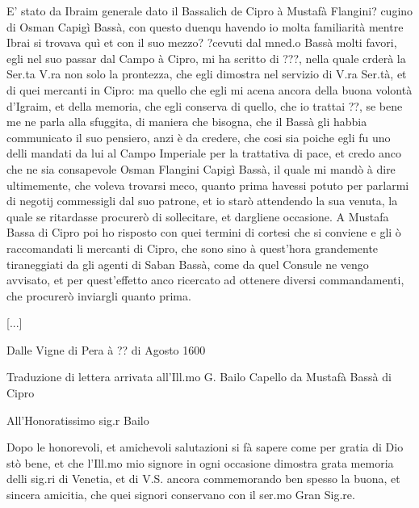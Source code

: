 E'  stato da  Ibraim generale  dato il  Bassalich de  Cipro  à Mustafà
Flangini? cugino di  Osman Capigì Bassà, con questo  duenqu havendo io
molta familiarità  mentre Ibrai  si trovava quì  et con il  suo mezzo?
?cevuti dal mned.o Bassà molti favori, egli nel suo passar dal Campo à
Cipro, mi  ha scritto di  ???, nella quale  crderà la Ser.ta  V.ra non
solo la prontezza,  che egli dimostra nel servizio  di V.ra Ser.tà, et
di quei  mercanti in Cipro: ma  quello che egli mi  acena ancora della
buona volontà d'Igraim, et della memoria, che egli conserva di quello,
che io trattai  ??, se bene me ne parla alla  sfuggita, di maniera che
bisogna, che il  Bassà gli habbia communicato il  suo pensiero, anzi è
da credere,  che cosi sia poiche egli  fu uno delli mandati  da lui al
Campo Imperiale  per la trattativa di  pace, et credo anco  che ne sia
consapevole  Osman Flangini  Capigì Bassà,  il quale  mi mandò  à dire
ultimemente, che voleva trovarsi meco, quanto prima havessi potuto per
parlarmi  di  negotij  commessigli   dal  suo  patrone,  et  io  starò
attendendo  la  sua  venuta,  la  quale  se  ritardasse  procurerò  di
sollecitare, et dargliene  occasione. A Mustafa Bassa di  Cipro poi ho
risposto  con  quei  termini  di  cortesi  che si  conviene  e  gli  ò
raccomandati  li  mercanti  di  Cipro,  che  sono  sino  à  quest'hora
grandemente tiraneggiati  da gli agenti  di Saban Bassà, come  da quel
Consule  ne vengo  avvisato, et  per quest'effetto  anco  ricercato ad
ottenere diversi commandamenti, che procurerò inviargli quanto prima.

[...]

\stopcifrato

Dalle Vigne di Pera à ?? di Agosto 1600



\begin{center}
Traduzione di lettera arrivata all'Ill.mo G. Bailo Capello da Mustafà Bassà di Cipro

All'Honoratissimo sig.r Bailo
\end{center}

Dopo le  honorevoli, et amichevoli  salutazioni si fà sapere  come per
gratia di Dio stò bene, et  che l'Ill.mo mio signore in ogni occasione
dimostra  grata memoria  delli sig.ri  di Venetia,  et di  V.S. ancora
commemorando  ben  spesso la  buona,  et  sincera  amicitia, che  quei
signori conservano con il ser.mo Gran Sig.re.

